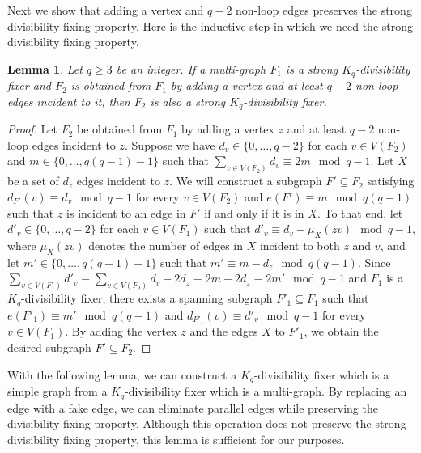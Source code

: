 \documentclass[11pt]{article}
\numberwithin{equation}{section}
\newcounter{i}
\theoremstyle{plain}
\newtheorem{lem}[thm]{Lemma}
\theoremstyle{plain} %
\theoremstyle{definition}
\begin{document}
Next we show that adding a vertex and $q - 2$ non-loop edges preserves the strong divisibility fixing property.  Here is the inductive step in which we need the strong divisibility fixing property.

\begin{lem}\label{lem:div-fixer-inductive-step}
    Let $q \geq 3$ be an integer.  If a multi-graph $F_1$ is a strong $K_q$-divisibility fixer and $F_2$ is obtained from $F_1$ by adding a vertex and at least $q - 2$ non-loop edges incident to it, then $F_2$ is also a strong $K_q$-divisibility fixer.
\end{lem}
\begin{proof}
    Let $F_2$ be obtained from $F_1$ by adding a vertex $z$ and at least $q - 2$ non-loop edges incident to $z$.  Suppose we have $d_v \in \{0, \dots, q - 2\}$ for each $v\in V(F_2)$ and $m \in \{0, \dots, q(q - 1) - 1\}$ such that $\sum_{v\in V(F_2)}d_v \equiv 2m \mod q - 1$.  Let $X$ be a set of $d_z$ edges incident to $z$.  We will construct a subgraph $F' \subseteq F_2$ satisfying $d_{F'}(v) \equiv d_v \mod q - 1$ for every $v \in V(F_2)$ and $e(F') \equiv m \mod q(q - 1)$ such that $z$ is incident to an edge in $F'$ if and only if it is in $X$.  To that end, let $d'_v \in \{0, \dots, q - 2\}$ for each $v \in V(F_1)$ such that $d'_v \equiv d_v - \mu_X(zv) \mod q - 1$, where $\mu_X(zv)$ denotes the number of edges in $X$ incident to both $z$ and $v$, and let $m' \in \{0, \dots, q(q - 1) - 1\}$ such that $m' \equiv m - d_z \mod q(q - 1)$.  Since $\sum_{v\in V(F_1)}d'_v \equiv \sum_{v\in V(F_2)}d_v - 2d_z \equiv 2m - 2d_z \equiv 2m' \mod q - 1$ and $F_1$ is a $K_q$-divisibility fixer, there exists a spanning subgraph $F'_1 \subseteq F_1$ such that $e(F'_1) \equiv m' \mod q(q - 1)$ and $d_{F'_1}(v) \equiv d'_v \mod q - 1$ for every $v \in V(F_1)$.  By adding the vertex $z$ and the edges $X$ to $F'_1$, we obtain the desired subgraph $F' \subseteq F_2$. 
\end{proof}

With the following lemma, we can construct a $K_q$-divisibility fixer which is a simple graph from a $K_q$-divisibility fixer which is a multi-graph.  By replacing an edge with a fake edge, we can eliminate parallel edges while preserving the divisibility fixing property.  Although this operation does not preserve the strong divisibility fixing property, this lemma is sufficient for our purposes.
\end{document}
